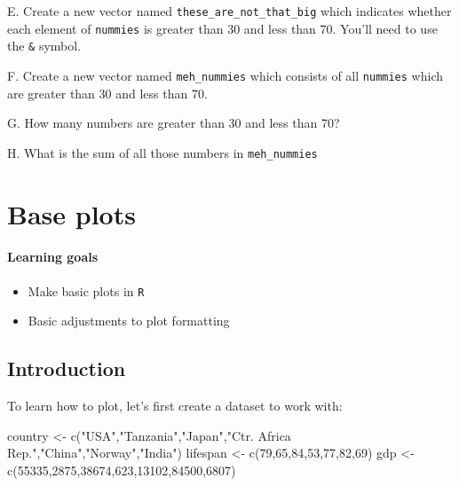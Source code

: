 \documentclass[
]{book}
\newenvironment{Shaded}{\begin{snugshade}}{\end{snugshade}}
\newcommand{\DecValTok}[1]{\textcolor[rgb]{0.00,0.00,0.81}{#1}}
\newcommand{\FunctionTok}[1]{\textcolor[rgb]{0.00,0.00,0.00}{#1}}
\newcommand{\NormalTok}[1]{#1}
\newcommand{\OtherTok}[1]{\textcolor[rgb]{0.56,0.35,0.01}{#1}}
\newcommand{\StringTok}[1]{\textcolor[rgb]{0.31,0.60,0.02}{#1}}
\providecommand{\tightlist}{%
  \setlength{\itemsep}{0pt}\setlength{\parskip}{0pt}}
\begin{document}
E. Create a new vector named \texttt{these\_are\_not\_that\_big} which indicates whether each element of \texttt{nummies} is greater than 30 and less than 70. You'll need to use the \texttt{\&} symbol.

F. Create a new vector named \texttt{meh\_nummies} which consists of all \texttt{nummies} which are greater than 30 and less than 70.

G. How many numbers are greater than 30 and less than 70?

H. What is the sum of all those numbers in \texttt{meh\_nummies}

\hypertarget{base-plots}{%
\chapter{Base plots}\label{base-plots}}

\hypertarget{learning-goals-6}{%
\subsubsection*{Learning goals}\label{learning-goals-6}}

\begin{itemize}
\tightlist
\item
  Make basic plots in \texttt{R}
\item
  Basic adjustments to plot formatting
\end{itemize}

\hypertarget{introduction}{%
\section*{Introduction}\label{introduction}}

To learn how to plot, let's first create a dataset to work with:

\begin{Shaded}
\begin{Highlighting}[]
\NormalTok{country }\OtherTok{\textless{}{-}} \FunctionTok{c}\NormalTok{(}\StringTok{"USA"}\NormalTok{,}\StringTok{"Tanzania"}\NormalTok{,}\StringTok{"Japan"}\NormalTok{,}\StringTok{"Ctr. Africa Rep."}\NormalTok{,}\StringTok{"China"}\NormalTok{,}\StringTok{"Norway"}\NormalTok{,}\StringTok{"India"}\NormalTok{)}
\NormalTok{lifespan }\OtherTok{\textless{}{-}} \FunctionTok{c}\NormalTok{(}\DecValTok{79}\NormalTok{,}\DecValTok{65}\NormalTok{,}\DecValTok{84}\NormalTok{,}\DecValTok{53}\NormalTok{,}\DecValTok{77}\NormalTok{,}\DecValTok{82}\NormalTok{,}\DecValTok{69}\NormalTok{)}
\NormalTok{gdp }\OtherTok{\textless{}{-}} \FunctionTok{c}\NormalTok{(}\DecValTok{55335}\NormalTok{,}\DecValTok{2875}\NormalTok{,}\DecValTok{38674}\NormalTok{,}\DecValTok{623}\NormalTok{,}\DecValTok{13102}\NormalTok{,}\DecValTok{84500}\NormalTok{,}\DecValTok{6807}\NormalTok{)}
\end{Highlighting}
\end{Shaded}
\end{document}

